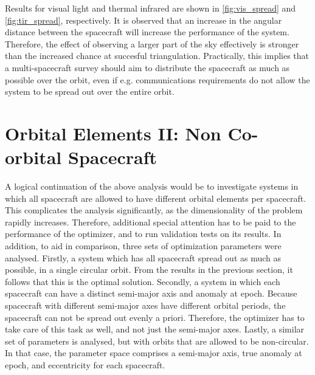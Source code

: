 Results for visual light and thermal infrared are shown in \autoref{fig:vis_spread} and \autoref{fig:tir_spread}, respectively. It is observed that an increase in the angular distance between the spacecraft will increase the performance of the system. Therefore, the effect of observing a larger part of the sky effectively is stronger than the increased chance at succesful triangulation. Practically, this implies that a multi-spacecraft survey should aim to distribute the spacecraft as much as possible over the orbit, even if e.g. communications requirements do not allow the system to be spread out over the entire orbit.

\section{Orbital Elements II: Non Co-orbital Spacecraft}
\label{sec:results_orbits_two}
A logical continuation of the above analysis would be to investigate systems in which all spacecraft are allowed to have different orbital elements per spacecraft. This complicates the analysis significantly, as the dimensionality of the problem rapidly increases. Therefore, additional special attention has to be paid to the performance of the optimizer, and to run validation tests on its results. In addition, to aid in comparison, three sets of optimization parameters were analysed. Firstly, a system which has all spacecraft spread out as much as possible, in a single circular orbit. From the results in the previous section, it follows that this is the optimal solution. Secondly, a system in which each spacecraft can have a distinct semi-major axis and anomaly at epoch. Because spacecraft with different semi-major axes have different orbital periods, the spacecraft can not be spread out evenly a priori. Therefore, the optimizer has to take care of this task as well, and not just the semi-major axes. Lastly, a similar set of parameters is analysed, but with orbits that are allowed to be non-circular. In that case, the parameter space comprises a semi-major axis, true anomaly at epoch, and eccentricity for each spacecraft.\\


